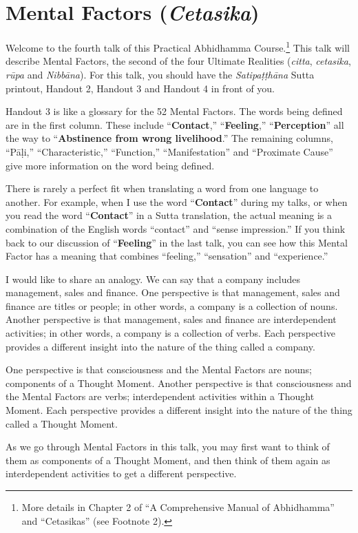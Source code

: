 \section{Mental Factors (\textit{Cetasika})}

Welcome to the fourth talk of this Practical Abhidhamma Course.\footnote{More details in Chapter 2 of “A Comprehensive Manual of Abhidhamma” and “Cetasikas” (see Footnote 2).} This talk will describe Mental Factors, the second of the four Ultimate Realities (\textit{citta}, \textit{cetasika}, \textit{rūpa} and \textit{Nibbāna}). For this talk, you should have the \textit{Satipaṭṭhāna} Sutta printout, Handout 2, Handout 3 and Handout 4 in front of you.

Handout 3 is like a glossary for the 52 Mental Factors. The words being defined are in the first column. These include “\textbf{Contact},” “\textbf{Feeling},” “\textbf{Perception}” all the way to “\textbf{Abstinence from wrong livelihood}.” The remaining columns, “Pāḷi,” “Characteristic,” “Function,” “Manifestation” and “Proximate Cause” give more information on the word being defined.

There is rarely a perfect fit when translating a word from one language to another. For example, when I use the word “\textbf{Contact}” during my talks, or when you read the word “\textbf{Contact}” in a Sutta translation, the actual meaning is a combination of the English words “contact” and “sense impression.” If you think back to our discussion of “\textbf{Feeling}” in the last talk, you can see how this Mental Factor has a meaning that combines “feeling,” “sensation” and “experience.”

I would like to share an analogy. We can say that a company includes management, sales and finance. One perspective is that management, sales and finance are titles or people; in other words, a company is a collection of nouns. Another perspective is that management, sales and finance are interdependent activities; in other words, a company is a collection of verbs. Each perspective provides a different insight into the nature of the thing called a company.

One perspective is that consciousness and the Mental Factors are nouns; components of a Thought Moment. Another perspective is that consciousness and the Mental Factors are verbs; interdependent activities within a Thought Moment. Each perspective provides a different insight into the nature of the thing called a Thought Moment.

As we go through Mental Factors in this talk, you may first want to think of them as components of a Thought Moment, and then think of them again as interdependent activities to get a different perspective.

